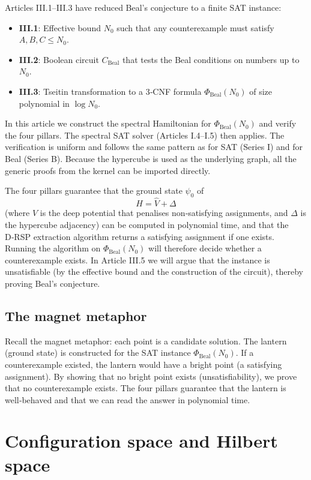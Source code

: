 \documentclass[11pt,a4paper]{article}
\begin{document}
Articles III.1–III.3 have reduced Beal's conjecture to a finite SAT instance:
\begin{itemize}
\item \textbf{III.1}: Effective bound \(N_0\) such that any counterexample must satisfy \(A,B,C \le N_0\).
\item \textbf{III.2}: Boolean circuit \(C_{\text{Beal}}\) that tests the Beal conditions on numbers up to \(N_0\).
\item \textbf{III.3}: Tseitin transformation to a 3‑CNF formula \(\Phi_{\text{Beal}}(N_0)\) of size polynomial in \(\log N_0\).
\end{itemize}
In this article we construct the spectral Hamiltonian for \(\Phi_{\text{Beal}}(N_0)\) and verify the four pillars. The spectral SAT solver (Articles I.4–I.5) then applies. The verification is uniform and follows the same pattern as for SAT (Series I) and for Beal (Series B). Because the hypercube is used as the underlying graph, all the generic proofs from the kernel can be imported directly.

The four pillars guarantee that the ground state \(\psi_0\) of
\[
H = \hat{V} + \Delta
\]
(where \(\hat{V}\) is the deep potential that penalises non‑satisfying assignments, and \(\Delta\) is the hypercube adjacency) can be computed in polynomial time, and that the D‑RSP extraction algorithm returns a satisfying assignment if one exists. Running the algorithm on \(\Phi_{\text{Beal}}(N_0)\) will therefore decide whether a counterexample exists. In Article III.5 we will argue that the instance is unsatisfiable (by the effective bound and the construction of the circuit), thereby proving Beal's conjecture.

\subsection{The magnet metaphor}

Recall the magnet metaphor: each point is a candidate solution. The lantern (ground state) is constructed for the SAT instance \(\Phi_{\text{Beal}}(N_0)\). If a counterexample existed, the lantern would have a bright point (a satisfying assignment). By showing that no bright point exists (unsatisfiability), we prove that no counterexample exists. The four pillars guarantee that the lantern is well‑behaved and that we can read the answer in polynomial time.

\section{Configuration space and Hilbert space}
\end{document}
